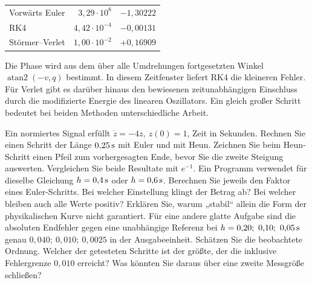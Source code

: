 {\tblstart\begin{tabularx}{\linewidth}{@{}Yrr@{}}\toprule
{}&&\\\midrule
Vorwärts Euler & \(3{,}29\cdot10^8\)& \(-1{,}30222\)\\
RK4 & \(4{,}42\cdot10^{-4}\)& \(-0{,}00131\)\\
Störmer--Verlet & \(1{,}00\cdot10^{-2}\)& \(+0{,}16909\)\\\bottomrule
\end{tabularx}\par}
Die Phase wird aus dem über alle Umdrehungen fortgesetzten Winkel \(\operatorname{atan2}(-v,q)\) bestimmt. In diesem Zeitfenster liefert RK4 die kleineren Fehler. Für Verlet gibt es darüber hinaus den bewiesenen zeitunabhängigen Einschluss durch die modifizierte Energie des linearen Oszillators. Ein gleich großer Schritt bedeutet bei beiden Methoden unterschiedliche Arbeit.


Ein normiertes Signal erfüllt \(\dot z=-4z,\ z(0)=1\), Zeit in Sekunden. Rechnen Sie einen Schritt der Länge \(0{,}25\,\mathrm{s}\) mit Euler und mit Heun. Zeichnen Sie beim Heun-Schritt einen Pfeil zum vorhergesagten Ende, bevor Sie die zweite Steigung auswerten. Vergleichen Sie beide Resultate mit \(e^{-1}\).
Ein Programm verwendet für dieselbe Gleichung \(h=0{,}4\,\mathrm{s}\) oder \(h=0{,}6\,\mathrm{s}\). Berechnen Sie jeweils den Faktor eines Euler-Schritts. Bei welcher Einstellung klingt der Betrag ab? Bei welcher bleiben auch alle Werte positiv? Erklären Sie, warum „stabil“ allein die Form der physikalischen Kurve nicht garantiert.
Für eine andere glatte Aufgabe sind die absoluten Endfehler gegen eine unabhängige Referenz bei \(h=0{,}20;\ 0{,}10;\ 0{,}05\unitm s\) genau \(0{,}040;\ 0{,}010;\ 0{,}0025\) in der Ausgabeeinheit. Schätzen Sie die beobachtete Ordnung. Welcher der getesteten Schritte ist der größte, der die inklusive Fehlergrenze \(0{,}010\) erreicht? Was könnten Sie daraus über eine zweite Messgröße schließen?

